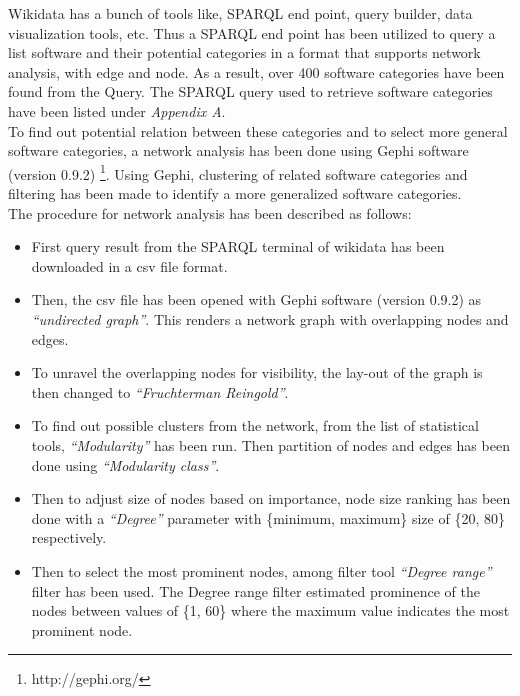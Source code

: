 Wikidata has a bunch of tools like, SPARQL end point, query builder, data visualization tools, etc. Thus a SPARQL end point has been utilized  to query a list software and their potential categories in a format that supports network analysis, with edge and node. As a result, over 400 software categories have been found from the Query. The SPARQL query used to retrieve software categories have been listed under \emph{Appendix A}.\\

To find out potential relation between these categories and to select more general software categories, a network analysis has been done using Gephi software (version 0.9.2) \footnote{http://gephi.org/}. Using Gephi, clustering of related software categories and filtering has been made to identify a more generalized software categories. \\

\noindent The procedure for network analysis has been described as follows:

\begin{itemize}
	\itemsep1em
	\item First query result from the SPARQL terminal of wikidata has been downloaded in a csv file format. 
	\item Then, the csv file has been opened with Gephi software (version 0.9.2) as \emph{“undirected graph”}. This renders a network graph with overlapping nodes and edges. 
	\item To unravel the overlapping nodes for visibility, the lay-out of the graph is then changed to \emph{“Fruchterman Reingold”}. 
	\item To find out possible clusters from the network, from the list of statistical tools, \emph{“Modularity”} has been run. Then partition of nodes and edges has been done using \emph{“Modularity class”}. 
	\item Then to adjust size of nodes based on importance, node size ranking has been done with a \emph{“Degree”} parameter with \{minimum, maximum\} size of  \{20, 80\} respectively. 
	\item Then to select the most prominent nodes, among filter tool \emph{“Degree range”} filter has been used. The Degree range filter estimated prominence of the nodes between values of \{1, 60\} where the maximum value indicates the most prominent node. 
\end{itemize}

